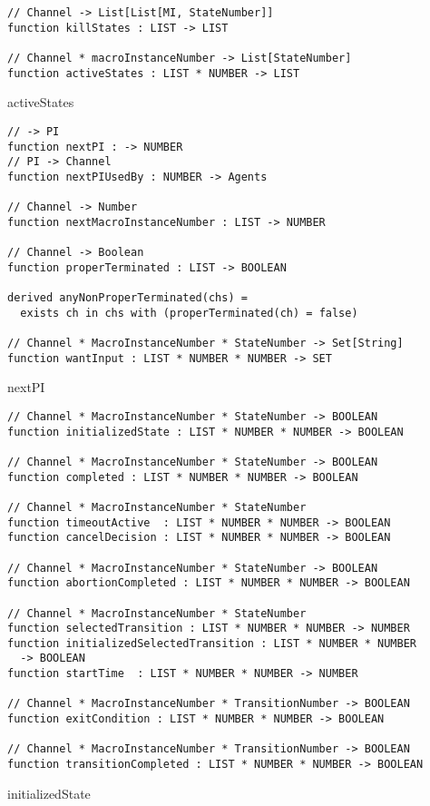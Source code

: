 \begin{listing}[H]
\begin{verbatim}
// Channel -> List[List[MI, StateNumber]]
function killStates : LIST -> LIST

// Channel * macroInstanceNumber -> List[StateNumber]
function activeStates : LIST * NUMBER -> LIST
\end{verbatim}
\caption{activeStates}
\label{lst:asm:activeStates}
\end{listing}


\begin{listing}[H]
\begin{verbatim}
// -> PI
function nextPI : -> NUMBER
// PI -> Channel
function nextPIUsedBy : NUMBER -> Agents

// Channel -> Number
function nextMacroInstanceNumber : LIST -> NUMBER

// Channel -> Boolean
function properTerminated : LIST -> BOOLEAN

derived anyNonProperTerminated(chs) =
  exists ch in chs with (properTerminated(ch) = false)

// Channel * MacroInstanceNumber * StateNumber -> Set[String]
function wantInput : LIST * NUMBER * NUMBER -> SET
\end{verbatim}
\caption{nextPI}
\label{lst:asm:nextPI}
\end{listing}



\begin{listing}[H]
\begin{verbatim}
// Channel * MacroInstanceNumber * StateNumber -> BOOLEAN
function initializedState : LIST * NUMBER * NUMBER -> BOOLEAN

// Channel * MacroInstanceNumber * StateNumber -> BOOLEAN
function completed : LIST * NUMBER * NUMBER -> BOOLEAN

// Channel * MacroInstanceNumber * StateNumber
function timeoutActive  : LIST * NUMBER * NUMBER -> BOOLEAN
function cancelDecision : LIST * NUMBER * NUMBER -> BOOLEAN

// Channel * MacroInstanceNumber * StateNumber -> BOOLEAN
function abortionCompleted : LIST * NUMBER * NUMBER -> BOOLEAN

// Channel * MacroInstanceNumber * StateNumber
function selectedTransition : LIST * NUMBER * NUMBER -> NUMBER
function initializedSelectedTransition : LIST * NUMBER * NUMBER
  -> BOOLEAN
function startTime  : LIST * NUMBER * NUMBER -> NUMBER

// Channel * MacroInstanceNumber * TransitionNumber -> BOOLEAN
function exitCondition : LIST * NUMBER * NUMBER -> BOOLEAN

// Channel * MacroInstanceNumber * TransitionNumber -> BOOLEAN
function transitionCompleted : LIST * NUMBER * NUMBER -> BOOLEAN
\end{verbatim}
\caption{initializedState}
\label{lst:asm:initializedState}
\end{listing}



